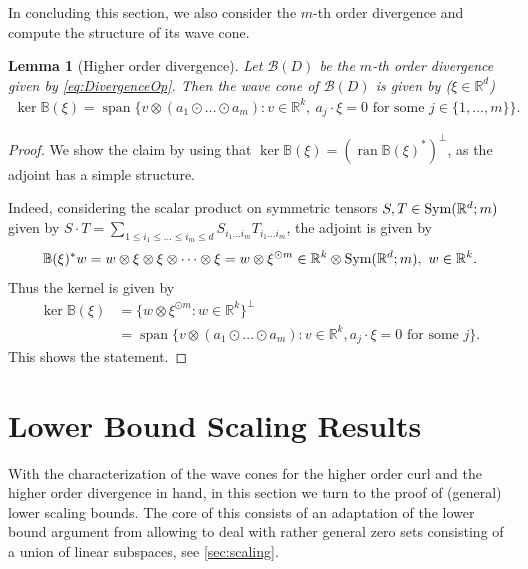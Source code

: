 \documentclass[a4paper, 10pt, twoside, notitlepage]{amsart}
\theoremstyle{plain}
\newtheorem{lem}[prop]{Lemma}
\newcommand{\R}{\mathbb{R}}
\renewcommand{\S}[1]{\textup{Sym}(\R^d;#1)}
\DeclareMathOperator{\vspan}{span}
\begin{document}
		In concluding this section, we also consider the $m$-th order divergence and compute the structure of its wave
		cone.
		
		\begin{lem}[Higher order divergence] \label{rmk:Divergence} Let $\mathcal{B}(D)$ be the $m$-th order divergence given by \cref{eq:DivergenceOp}.			
                  Then the wave cone of $\mathcal{B}(D)$ is given by ($\xi \in \R^d$)
			\begin{align*}
				\ker \mathbb{B}(\xi) = \vspan \Big\{ v \otimes (a_1 \odot \dots \odot a_m): v \in \R^k, \ a_j \cdot \xi = 0 \text{ for some } j \in \{1,\dots,m\} \Big\}.
			\end{align*}
                      \end{lem}
                      
                      \begin{proof}
                        We show the claim by using that $\ker \mathbb{B}(\xi) = (\operatorname{ran} \mathbb{B}(\xi)^\ast)^\perp$, as the adjoint has a simple structure.
                        
                  Indeed, considering the scalar product on symmetric
				tensors $S,T \in \S{m}$ given by $S \cdot T = \sum_{1\leq i_1 \leq \dots \leq i_m \leq d} S_{i_1 \dots i_m} T_{i_1 \dots i_m}$,
                  the adjoint is given by 
			\begin{align*}
				\mathbb{B}(\xi)^\ast w = w \otimes \xi \otimes \xi \otimes \dots \otimes \xi = w \otimes \xi^{\odot m} \in \R^k \otimes \S{m}, \  w \in \R^k.
			\end{align*}
			Thus the kernel is given by
			\begin{align*}
                          \ker \mathbb{B}(\xi) & = \{w \otimes \xi^{\odot m}: w \in \R^k\}^\perp  \\
                          & = \vspan\Big\{v \otimes (a_1 \odot \dots \odot a_m): v \in \R^k, a_j \cdot \xi = 0 \mbox{ for some } j\Big\}.
			\end{align*}
                        This shows the statement.
		\end{proof}
		
		
		
		\section{Lower Bound Scaling Results}
		\label{sec:lower}
		
		With the characterization of the wave cones for the higher order curl and the higher order divergence in hand, in this section we turn to the proof of (general) lower scaling
		bounds. The core of this consists of an adaptation of the lower bound argument from \cite{RRT23} allowing to deal with rather general zero sets consisting of a union of linear subspaces, see \cref{sec:scaling}.
                
\end{document}
